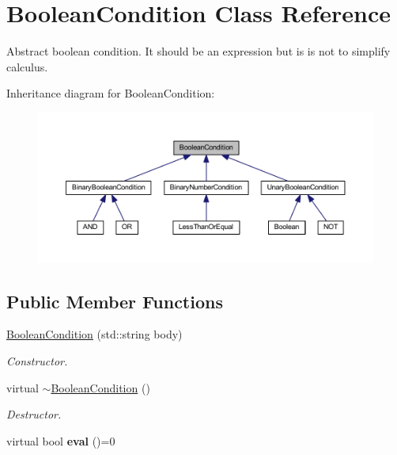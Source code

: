\hypertarget{class_boolean_condition}{\section{Boolean\-Condition Class Reference}
\label{class_boolean_condition}
}


Abstract boolean condition. It should be an expression but is is not to simplify calculus.  




Inheritance diagram for Boolean\-Condition\-:\nopagebreak
\begin{figure}[H]
\begin{center}
\leavevmode
\includegraphics[width=350pt]{class_boolean_condition__inherit__graph}
\end{center}
\end{figure}
\subsection*{Public Member Functions}
\begin{DoxyCompactItemize}
\item 
\hyperlink{class_boolean_condition_a7566e4b7418a39def0a6f9f4a4c36d59}{Boolean\-Condition} (std\-::string body)
\begin{DoxyCompactList}\small\item\em Constructor. \end{DoxyCompactList}\item 
\hypertarget{class_boolean_condition_a93e485184e45ac484ba6dcff8ce837a5}{virtual \hyperlink{class_boolean_condition_a93e485184e45ac484ba6dcff8ce837a5}{$\sim$\-Boolean\-Condition} ()}\label{class_boolean_condition_a93e485184e45ac484ba6dcff8ce837a5}

\begin{DoxyCompactList}\small\item\em Destructor. \end{DoxyCompactList}\item 
\hypertarget{class_boolean_condition_a0aa5de22637022585f20c9254723406e}{virtual bool {\bfseries eval} ()=0}\label{class_boolean_condition_a0aa5de22637022585f20c9254723406e}

\end{DoxyCompactItemize}
